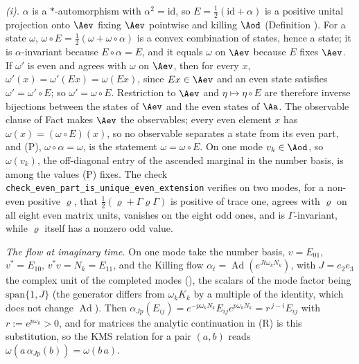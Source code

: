 \emph{(i).} $\alpha$ is a $*$-automorphism with $\alpha^2 = \mathrm{id}$, so $E = \tfrac12(\mathrm{id} + \alpha)$ is a positive unital projection onto $\Aev$ fixing $\Aev$ pointwise and killing $\Aod$ (Definition ). For a state $\omega$, $\omega \circ E = \tfrac12(\omega + \omega \circ \alpha)$ is a convex combination of states, hence a state; it is $\alpha$-invariant because $E \circ \alpha = E$, and it equals $\omega$ on $\Aev$ because $E$ fixes $\Aev$. If $\omega'$ is even and agrees with $\omega$ on $\Aev$, then for every $x$, $\omega'(x) = \omega'(Ex) = \omega(Ex)$, since $Ex \in \Aev$ and an even state satisfies $\omega' = \omega' \circ E$; so $\omega' = \omega \circ E$. Restriction to $\Aev$ and $\eta \mapsto \eta \circ E$ are therefore inverse bijections between the states of $\Aev$ and the even states of $\Aa$. The observable clause of Fact  makes $\Aev$ the observables; every even element $x$ has $\omega(x) = (\omega \circ E)(x)$, so no observable separates a state from its even part, and (P), $\omega \circ \alpha = \omega$, is the statement $\omega = \omega \circ E$. On one mode $v_k \in \Aod$, so $\omega(v_k)$, the off-diagonal entry of the ascended marginal in the number basis, is among the values (P) fixes. The check \texttt{check\_even\_part\_is\_unique\_even\_extension} verifies on two modes, for a non-even positive $\varrho$, that $\tfrac12(\varrho + \Gamma\varrho\Gamma)$ is positive of trace one, agrees with $\varrho$ on all eight even matrix units, vanishes on the eight odd ones, and is $\Gamma$-invariant, while $\varrho$ itself has a nonzero odd value.

\emph{The flow at imaginary time.} On one mode take the number basis, $v = E_{01}$, $v^{*} = E_{10}$, $v^{*}v = N_k = E_{11}$, and the Killing flow $\alpha_t = \operatorname{Ad}(e^{Jt\omega_k N_k})$, with $J = e_{2}e_{3}$ the complex unit of the completed modes (), the scalars of the mode factor being $\mathrm{span}\{1, J\}$ (the generator differs from $\omega_k K_k$ by a multiple of the identity, which does not change $\operatorname{Ad}$). Then $\alpha_{Jp}(E_{ij}) = e^{-p\omega_k N_k} E_{ij} e^{p\omega_k N_k} = r^{\,j - i} E_{ij}$ with $r := e^{p\omega_k} > 0$, and for matrices the analytic continuation in (R) is this substitution, so the KMS relation for a pair $(a, b)$ reads $\omega(a\,\alpha_{Jp}(b)) = \omega(b\,a)$.

